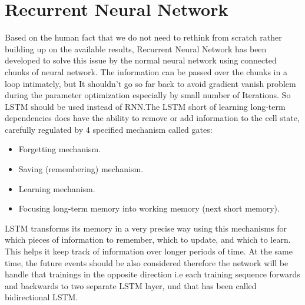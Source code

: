 \section{Recurrent Neural Network}\label{sec:rnn}
Based on the human fact that we do not need to rethink from scratch rather building up on the available results, Recurrent Neural Network has been developed to solve this issue by the normal neural network using connected chunks of neural network. The information can be passed over the chunks in a loop intimately, but It shouldn’t go so far back to avoid gradient vanish problem during the parameter optimization especially by small number of Iterations. So LSTM should be used instead of RNN.The LSTM short of learning long-term dependencies does have the ability to remove or add information to the cell state, carefully regulated by 4 specified mechanism called gates:
\begin{itemize}
\item Forgetting mechanism.
\item Saving (remembering) mechanism.
\item Learning mechanism.
\item Focusing long-term memory into working memory (next short memory).
\end{itemize}
LSTM transforms its memory in a very precise way using this mechanisms for which pieces of information to remember, which to update, and which to learn. This helps it keep track of information over longer periods of time. At the same time, the future events should be also considered therefore the network will be handle that trainings in the opposite direction i.e each training sequence forwards and backwards to two separate LSTM layer, und that has been called bidirectional LSTM. 
 
